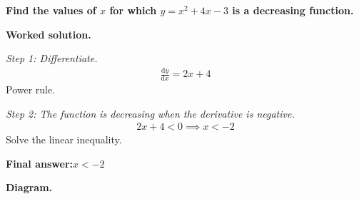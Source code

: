 \documentclass[11pt]{article}
\newcommand{\question}[1]{\par\medskip\noindent\textbf{#1}\par}
\begin{document}
\question{Find the values of \( x \) for which \( y = x^2 + 4x - 3 \) is a decreasing function.}

\textbf{Worked solution.}

\textit{Step 1: Differentiate.}
\[\begin{gathered}
\frac{\mathrm{d}y}{\mathrm{d}x} = 2x + 4
\end{gathered}\]
Power rule.

\textit{Step 2: The function is decreasing when the derivative is negative.}
\[\begin{gathered}
2x + 4 < 0 \implies x < -2
\end{gathered}\]
Solve the linear inequality.

\begin{answerbox}
\textbf{Final answer:}\quad \(\displaystyle  x < -2 \)
\end{answerbox}
\textbf{Diagram.}
\end{document}

